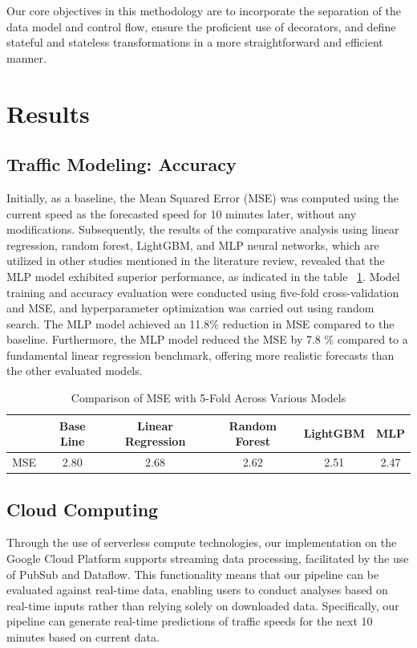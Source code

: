 Our core objectives in this methodology are to incorporate the separation of the data model and control flow, ensure the proficient use of decorators, and define stateful and stateless transformations in a more straightforward and efficient manner.

\section{Results}
\subsection{Traffic Modeling: Accuracy}
 Initially, as a baseline, the Mean Squared Error (MSE) was computed using the current speed as the forecasted speed for 10 minutes later, without any modifications. Subsequently, the results of the comparative analysis using linear regression, random forest, LightGBM, and MLP neural networks, which are utilized in other studies mentioned in the literature review, revealed that the MLP model exhibited superior performance, as indicated in the table ~\ref{table:mse_comparison_transposed}. Model training and accuracy evaluation were conducted using five-fold cross-validation and MSE, and hyperparameter optimization was carried out using random search. The MLP model achieved an 11.8\% reduction in MSE compared to the baseline. Furthermore, the MLP model reduced the MSE by 7.8 \% compared to a fundamental linear regression benchmark, offering more realistic forecasts than the other evaluated models.

\begin{table}[ht]
\centering
\begin{tabular}{c|c|c|c|c|c}
 &Base Line & Linear Regression & Random Forest & LightGBM & MLP \\ \hline
MSE & 2.80 &2.68 & 2.62 & 2.51 & 2.47
\end{tabular}
\caption{Comparison of MSE with 5-Fold Across Various Models}
\label{table:mse_comparison_transposed}
\end{table}

\subsection{Cloud Computing}
 Through the use of serverless compute technologies, our implementation on the Google Cloud Platform supports streaming data processing, facilitated by the use of PubSub and Dataflow. This functionality means that our pipeline can be evaluated against real-time data, enabling users to conduct analyses based on real-time inputs rather than relying solely on downloaded data. Specifically, our pipeline can generate real-time predictions of traffic speeds for the next 10 minutes based on current data.

